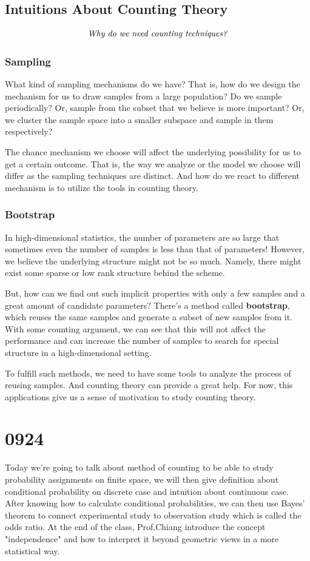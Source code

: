 \documentclass[11pt]{report}
\begin{document}
\section{Intuitions About Counting Theory}
$$\mbox{\it Why do we need counting techniques?}$$
\subsection{Sampling}
What kind of sampling mechanisms do we have? That is, how do we design the mechanism for us to draw samples from a large population? Do we sample periodically? Or, sample from the subset that we believe is more important? Or, we cluster the sample space into a smaller subspace and sample in them respectively?

The chance mechanism we choose will affect the underlying possibility for us to get a certain outcome. That is, the way we analyze or the model we choose will differ as the sampling techniques are distinct. And how do we react to different mechanism is to utilize the tools in counting theory.

\subsection{Bootstrap}
In high-dimensional statistics, the number of parameters are so large that sometimes even the number of samples is less than that of parameters! However, we believe the underlying structure might not be so much. Namely, there might exist some sparse or low rank structure behind the scheme.

But, how can we find out such implicit properties with only a few samples and a great amount of candidate parameters? There's a method called {\bf bootstrap}, which reuses the same samples and generate  a subset of new samples from it. With some counting argument, we can see that this will not affect the performance and can increase the number of samples to search for special structure in a high-dimensional setting.

To fulfill such methods, we need to have some tools to analyze the process of reusing samples. And counting theory can provide a great help. For now, this applications give us a sense of motivation to study counting theory.


\chapter{0924}
Today we're going to talk about method of counting to be able to study probability assignments on finite space, we will then give definition about conditional probability on discrete case and intuition about continuous case. After knowing how to calculate conditional probabilities, we can then use Bayes' theorem to connect experimental study to observation study which is called the odds ratio. At the end of the class, Prof.Chiang introduce the concept "independence" and how to interpret it beyond geometric views in a more statistical way.
\end{document}
